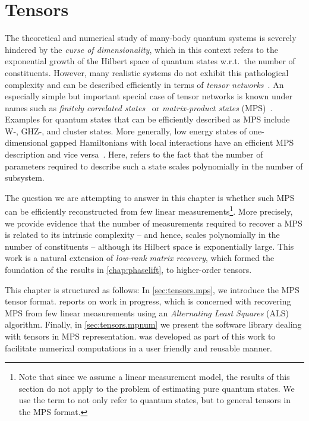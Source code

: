 \chapter{Tensors}%
\label{chap:tensors}



The theoretical and numerical study of many-body quantum systems is severely hindered by the \emph{curse of dimensionality}, which in this context refers to the exponential growth of the Hilbert space of quantum states w.r.t.\ the number of constituents.
However, many realistic systems do not exhibit this pathological complexity and can be described efficiently in terms of \emph{tensor networks}~\cite{}.
An especially simple but important special case of tensor networks is known under names such as \emph{finitely correlated states}~\cite{Fannes_1992_Finitely} or \emph{matrix-product states} (MPS)~\cite{Garcia_2006_Matrix,Verstraete_2008_Matrix,Orus_2014_Practical}.
Examples for quantum states that can be efficiently described as MPS include W-, GHZ-, and cluster states.
More generally, low energy states of one-dimensional gapped Hamiltonians with local interactions have an efficient MPS description and vice versa~\cite{}.
Here,  refers to the fact that the number of parameters required to describe such a state scales polynomially in the number of subsystem.

The question we are attempting to answer in this chapter is whether such MPS can be efficiently reconstructed from few linear measurements\footnote{%
  Note that since we assume a linear measurement model, the results of this section do not apply to the problem of estimating pure quantum states.
  We use the term  to not only refer to quantum states, but to general tensors in the MPS format.
}.
More precisely, we provide evidence that the number of measurements required to recover a MPS is related to its intrinsic complexity -- and hence, scales polynomially in the number of constituents -- although its Hilbert space is exponentially large.
This work is a natural extension of \emph{low-rank matrix recovery}, which formed the foundation of the results in \cref{chap:phaselift}, to higher-order tensors.\\

This chapter is structured as follows:
In \cref{sec:tensors.mps}, we introduce the MPS tensor format.
 reports on work in progress, which is concerned with recovering MPS from few linear measurements using an \emph{Alternating Least Squares} (ALS) algorithm.
Finally, in \cref{sec:tensors.mpnum} we present the software library \mpnum dealing with tensors in MPS representation.
\mpnum was developed as part of this work to facilitate numerical computations in a user friendly and reusable manner.


